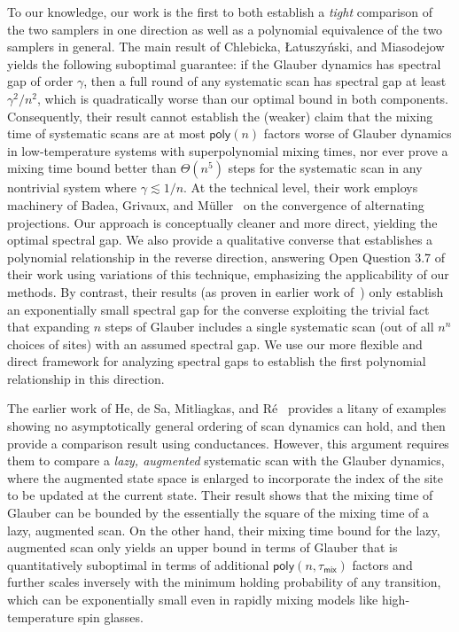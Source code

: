 \documentclass[11pt]{article}
\begin{document}
To our knowledge, our work is the first to both establish a \emph{tight} comparison of the two samplers in one direction as well as a polynomial equivalence of the two samplers in general. The main result of Chlebicka,  Łatuszy\'nski, and Miasodejow~\cite{chlebicka} yields the following suboptimal guarantee: if the Glauber dynamics has spectral gap of order $\gamma$, then a full round of any systematic scan has spectral gap at least $\gamma^2/n^2$, which is quadratically worse than our optimal bound in both components. Consequently, their result cannot establish the (weaker) claim that the mixing time of systematic scans are  at most $\mathsf{poly}(n)$ factors worse of Glauber dynamics in low-temperature systems with superpolynomial mixing times, nor ever prove a mixing time bound better than $\Theta(n^5)$ steps for the systematic scan in any nontrivial system where $\gamma\lesssim 1/n$. At the technical level, their work employs  machinery of Badea, Grivaux, and M\"uller~\cite{badea} on the convergence of alternating projections. Our approach is conceptually cleaner and more direct, yielding the optimal spectral gap. We also provide a qualitative converse that establishes a polynomial relationship in the reverse direction, answering Open Question 3.7 of their work using variations of this technique, emphasizing the applicability of our methods. By contrast, their results (as proven in earlier work of~\cite{roberts_rosenthal}) only establish an exponentially small spectral gap for the converse exploiting the trivial fact that expanding $n$ steps of Glauber includes a single systematic scan (out of all $n^n$ choices of sites) with an assumed spectral gap. We use our more flexible and direct framework for analyzing spectral gaps to establish the first polynomial relationship in this direction.

The earlier work of He, de Sa, Mitliagkas, and R\'e~\cite{DBLP:conf/nips/HeSMR16} provides a litany of examples showing no asymptotically general ordering of scan dynamics can hold, and then provide a comparison result using conductances. However, this argument requires them to compare a \emph{lazy, augmented} systematic scan with the Glauber dynamics, where the augmented state space is enlarged to incorporate the index of the site to be updated at the current state. Their result shows that the mixing time of Glauber can be bounded by the essentially the square of the mixing time of a lazy, augmented scan.  On the other hand, their mixing time bound for the lazy, augmented scan only yields an upper bound in terms of Glauber that is quantitatively suboptimal in terms of additional $\mathsf{poly}(n,\tau_{\mathsf{mix}})$ factors and further scales inversely with the minimum holding probability of any transition, which can be exponentially small even in rapidly mixing models like high-temperature spin glasses.
\end{document}
